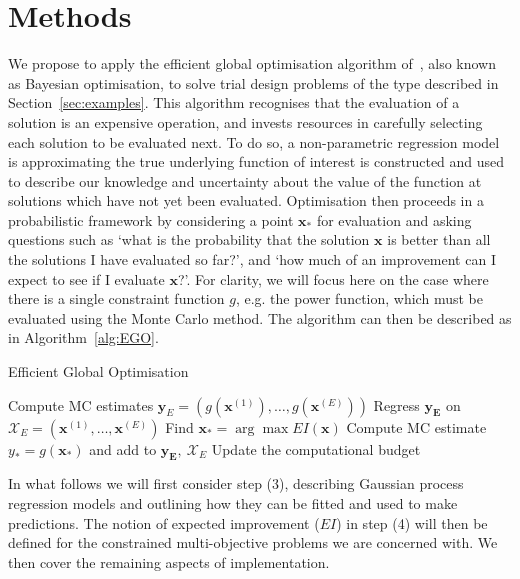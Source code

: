 \documentclass{article} %
\begin{document}
\section{Methods}\label{sec:methods}

We propose to apply the efficient global optimisation algorithm of~\cite{Jones1998}, also known as Bayesian optimisation, to solve trial design problems of the type described in Section~\ref{sec:examples}. This algorithm recognises that the evaluation of a solution is an expensive operation, and invests resources in carefully selecting each solution to be evaluated next. To do so, a non-parametric regression model is approximating the true underlying function of interest is constructed and used to describe our knowledge and uncertainty about the value of the function at solutions which have not yet been evaluated. Optimisation then proceeds in a probabilistic framework by considering a point $\textbf{x}_{*}$ for evaluation and asking questions such as `what is the probability that the solution $\textbf{x}$ is better than all the solutions I have evaluated so far?', and `how much of an improvement can I expect to see if I evaluate $\textbf{x}$?'. For clarity, we will focus here on the case where there is a single constraint function $g$, e.g. the power function, which must be evaluated using the Monte Carlo method. The algorithm can then be described as in Algorithm~\ref{alg:EGO}.

\begin{algorithm}
\caption{Efficient Global Optimisation}\label{alg:EGO}
\begin{algorithmic}[1]
\State Compute MC estimates $\mathbf{y}_{E} = (g(\mathbf{x}^{(1)}), \ldots , g(\mathbf{x}^{(E)}))$
\State Regress $\mathbf{y_{E}}$ on $\mathcal{X}_{E} = (\mathbf{x}^{(1)}, \ldots , \mathbf{x}^{(E)})$
\State Find $\mathbf{x}_{*} = \arg\max EI(\mathbf{x})$
\State Compute MC estimate $y_{*} = g(\mathbf{x}_{*})$ and add to $\mathbf{y_{E}},~\mathcal{X}_{E}$
\State Update the computational budget
\EndWhile
\end{algorithmic}
\end{algorithm}

In what follows we will first consider step (3), describing Gaussian process regression models and outlining how they can be fitted and used to make predictions. The notion of expected improvement ($EI$) in step (4) will then be defined for the constrained multi-objective problems we are concerned with. We then cover the remaining aspects of implementation.
\end{document}
